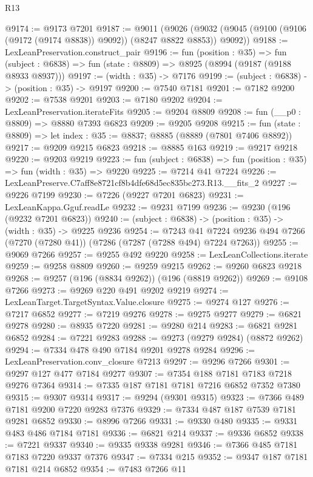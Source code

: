 \begin{lexlean}{R13}
\begin{coremodule}
@9174 := @9173 @7201
@9187 := @9011
    (@9026 (@9032 (@9045 (@9100 (@9106 (@9172 (@9174 @8838)) @9092)) (@8247 @8822 @8853)) @9092))
@9188 := LexLeanPreservation.construct_pair
@9196 := fun (position : @35) =>
  fun (subject : @6838) => fun (state : @8809) => @8925 (@8994 (@9187 (@9188 @8933 @8937)))
@9197 := (width : @35) -> @7176
@9199 := (subject : @6838) -> (position : @35) -> @9197
@9200 := @7540 @7181
@9201 := @7182 @9200
@9202 := @7538 @9201
@9203 := @7180 @9202
@9204 := LexLeanPreservation.iterateFits
@9205 := @9204 @8809
@9208 := fun (__p0 : @8809) => @8880 @7393 @6823
@9209 := @9205 @9208
@9215 := fun (state : @8809) => let index : @35 := @8837; @8885 (@8889 (@7801 @7406 @8892))
@9217 := @9209 @9215 @6823
@9218 := @8885 @163
@9219 := @9217 @9218
@9220 := @9203 @9219
@9223 := fun (subject : @6838) => fun (position : @35) => fun (width : @35) => @9220
@9225 := @7214 @41 @7224
@9226 := LexLeanPreserve.C7aff8e8721cf8b4dfe68d5ec835bc273.R13.__fits_2
@9227 := @9226 @7199
@9230 := @7226 (@9227 @7201 @6823)
@9231 := LexLeanKappa.Gguf.readLe
@9232 := @9231 @7199
@9236 := @9230 (@196 (@9232 @7201 @6823))
@9240 := (subject : @6838) -> (position : @35) -> (width : @35) -> @9225 @9236
@9254 := @7243
    @41
    @7224
    @9236
    @494
    @7266
    (@7270 (@7280 @41))
    (@7286 (@7287 (@7288 @494) @7224 @7263))
@9255 := @9069 @7266
@9257 := @9255 @492 @9220
@9258 := LexLeanCollections.iterate
@9259 := @9258 @8809
@9260 := @9259 @9215
@9262 := @9260 @6823 @9218
@9268 := @9257 (@196 (@8834 @9262)) (@196 (@8819 @9262))
@9269 := @9108 @7266
@9273 := @9269 @220 @491 @9202 @9219
@9274 := LexLeanTarget.TargetSyntax.Value.closure
@9275 := @9274 @127
@9276 := @7217 @6852
@9277 := @7219 @9276
@9278 := @9275 @9277
@9279 := @6821 @9278
@9280 := @8935 @7220
@9281 := @9280 @214
@9283 := @6821 @9281 @6852
@9284 := @7221 @9283
@9288 := @9273 (@9279 @9284) (@8872 @9262)
@9294 := @7334 @478 @490 @7184 @9201 @9278 @9284
@9296 := LexLeanPreservation.conv_closure @7213
@9297 := @9296 @7266
@9301 := @9297 @127 @477 @7184 @9277
@9307 := @7354 @188 @7181 @7183 @7218 @9276 @7364
@9314 := @7335 @187 @7181 @7181 @7216 @6852 @7352 @7380
@9315 := @9307 @9314
@9317 := @9294 (@9301 @9315)
@9323 := @7366 @489 @7181 @9200 @7220 @9283 @7376
@9329 := @7334 @487 @187 @7539 @7181 @9281 @6852
@9330 := @8996 @7266
@9331 := @9330 @480
@9335 := @9331 @483 @486 @7184 @7181
@9336 := @6821 @214
@9337 := @9336 @6852
@9338 := @7221 @9337
@9340 := @9335 @9338 @9281
@9346 := @7366 @485 @7181 @7183 @7220 @9337 @7376
@9347 := @7334 @215
@9352 := @9347 @187 @7181 @7181 @214 @6852
@9354 := @7483 @7266 @11

\end{coremodule}
\end{lexlean}
